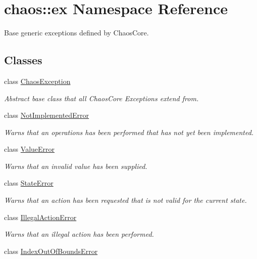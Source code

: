 \hypertarget{namespacechaos_1_1ex}{\section{chaos\-:\-:ex Namespace Reference}
\label{namespacechaos_1_1ex}
}


Base generic exceptions defined by Chaos\-Core.  


\subsection*{Classes}
\begin{DoxyCompactItemize}
\item 
class \hyperlink{classchaos_1_1ex_1_1_chaos_exception}{Chaos\-Exception}
\begin{DoxyCompactList}\small\item\em Abstract base class that all Chaos\-Core Exceptions extend from. \end{DoxyCompactList}\item 
class \hyperlink{classchaos_1_1ex_1_1_not_implemented_error}{Not\-Implemented\-Error}
\begin{DoxyCompactList}\small\item\em Warns that an operations has been performed that has not yet been implemented. \end{DoxyCompactList}\item 
class \hyperlink{classchaos_1_1ex_1_1_value_error}{Value\-Error}
\begin{DoxyCompactList}\small\item\em Warns that an invalid value has been supplied. \end{DoxyCompactList}\item 
class \hyperlink{classchaos_1_1ex_1_1_state_error}{State\-Error}
\begin{DoxyCompactList}\small\item\em Warns that an action has been requested that is not valid for the current state. \end{DoxyCompactList}\item 
class \hyperlink{classchaos_1_1ex_1_1_illegal_action_error}{Illegal\-Action\-Error}
\begin{DoxyCompactList}\small\item\em Warns that an illegal action has been performed. \end{DoxyCompactList}\item 
class \hyperlink{classchaos_1_1ex_1_1_index_out_of_bounds_error}{Index\-Out\-Of\-Bounds\-Error}

\end{DoxyCompactItemize}
